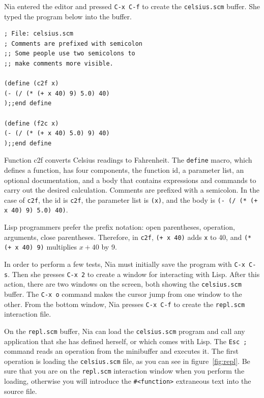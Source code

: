 \documentclass[a4paper,12pt]{book}
\begin{document}
Nia entered the editor and pressed \verb|C-x C-f| 
to create the \verb|celsius.scm| buffer. 
She typed the  program below into the buffer. 
\begin{verbatim}
; File: celsius.scm
; Comments are prefixed with semicolon
;; Some people use two semicolons to
;; make comments more visible.

(define (c2f x)
(- (/ (* (+ x 40) 9) 5.0) 40)
);;end define

(define (f2c x)
(- (/ (* (+ x 40) 5.0) 9) 40)
);;end define
\end{verbatim}
Function c2f converts Celsius readings to Fahrenheit.
The \verb|define| macro, which defines a function, 
has four components, the function id, a parameter list,
an optional documentation, and a body that contains
expressions and commands to carry out the desired
calculation. Comments are prefixed with a semicolon.
In the case of \verb|c2f|, the id is \verb|c2f|,
the parameter list is \verb|(x)|, and the body 
is \verb|(- (/ (* (+ x 40) 9) 5.0) 40)|.

Lisp programmers prefer the prefix notation:
open parentheses, operation, arguments, close parentheses.
Therefore, in  \verb|c2f|,  \verb|(+ x 40)|
adds \verb|x| to 40, and \verb|(* (+ x 40) 9)| multiplies $x+40$ by 9.

In order to perform a few tests, Nia must initially save
the program with \verb|C-x C-s|. Then she 
presses \verb|C-x 2| to create a window for interacting
with Lisp. After this action, there are two
windows on the screen, both 
showing the \verb|celsius.scm| buffer. The \verb|C-x o| command
makes the cursor jump from one window to the other.
From the bottom window, Nia presses \verb|C-x C-f| to
create the \verb|repl.scm| interaction file. 

On the \verb|repl.scm| buffer, 
Nia can load the \verb|celsius.scm| program
and  call any application that she has defined
herself, or which comes with Lisp.
The \verb|Esc ;| command reads an operation
from the  minibuffer and executes it.
The first operation is loading
the \verb|celsius.scm| file,
as you can see in figure~\ref{fig:repl}.
Be sure that you
are on the \verb|repl.scm| 
interaction window when you perform
the loading, otherwise you will introduce
the \verb|#<function>| extraneous 
text into the source file.
\end{document}
